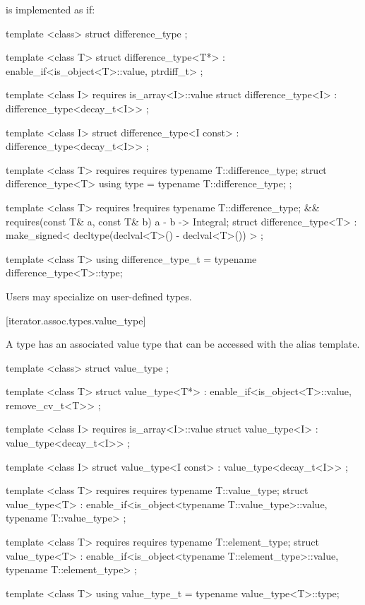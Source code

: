 \pnum
{}%
 is implemented as if:

%
\begin{codeblock}
  template <class> struct difference_type { };

  template <class T>
  struct difference_type<T*>
    : enable_if<is_object<T>::value, ptrdiff_t> { };

  template <class I>
    requires is_array<I>::value
  struct difference_type<I> : difference_type<decay_t<I>> { };

  template <class I>
  struct difference_type<I const> : difference_type<decay_t<I>> { };

  template <class T>
    requires requires { typename T::difference_type; }
  struct difference_type<T> {
    using type = typename T::difference_type;
  };

  template <class T>
    requires !requires { typename T::difference_type; } &&
      requires(const T& a, const T& b) { { a - b } -> Integral; }
  struct difference_type<T>
    : make_signed< decltype(declval<T>() - declval<T>()) > {
  };

  template <class T> using difference_type_t
    = typename difference_type<T>::type;
\end{codeblock}

\pnum
Users may specialize  on user-defined types.

[iterator.assoc.types.value_type]{}

\pnum
A  type has an associated value type that can be accessed with the
 alias template.

%
\begin{codeblock}
  template <class> struct value_type { };

  template <class T>
  struct value_type<T*>
    : enable_if<is_object<T>::value, remove_cv_t<T>> { };

  template <class I>
    requires is_array<I>::value
  struct value_type<I> : value_type<decay_t<I>> { };

  template <class I>
  struct value_type<I const> : value_type<decay_t<I>> { };

  template <class T>
    requires requires { typename T::value_type; }
  struct value_type<T>
    : enable_if<is_object<typename T::value_type>::value, typename T::value_type> { };

  template <class T>
    requires requires { typename T::element_type; }
  struct value_type<T>
    : enable_if<is_object<typename T::element_type>::value, typename T::element_type> { };

  template <class T> using value_type_t
    = typename value_type<T>::type;
\end{codeblock}

